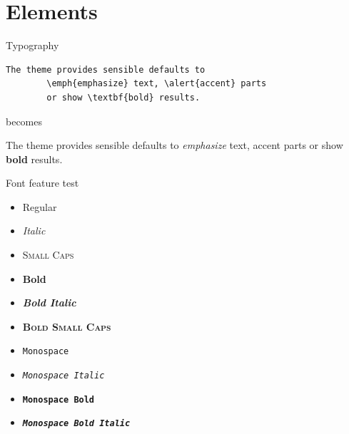\section{Elements}

\begin{frame}[fragile]{Typography}
	\begin{verbatim}The theme provides sensible defaults to
		\emph{emphasize} text, \alert{accent} parts
		or show \textbf{bold} results.\end{verbatim}
	
	\begin{center}becomes\end{center}
	
	The theme provides sensible defaults to \emph{emphasize} text,
	\alert{accent} parts or show \textbf{bold} results.
\end{frame}

\begin{frame}{Font feature test}
	\begin{itemize}
		\item Regular
		\item \textit{Italic}
		\item \textsc{Small Caps}
		\item \textbf{Bold}
		\item \textbf{\textit{Bold Italic}}
		\item \textbf{\textsc{Bold Small Caps}}
		\item \texttt{Monospace}
		\item \texttt{\textit{Monospace Italic}}
		\item \texttt{\textbf{Monospace Bold}}
		\item \texttt{\textbf{\textit{Monospace Bold Italic}}}
	\end{itemize}
\end{frame}

